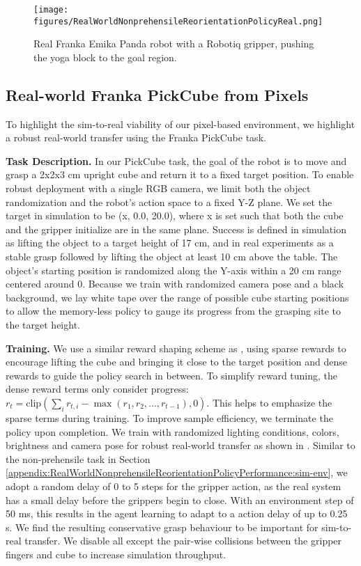 \begin{figure}[t]
    \centering
    \texttt{[image: figures/RealWorldNonprehensileReorientationPolicyReal.png]}
    \caption{\small Real Franka Emika Panda robot with a Robotiq gripper, pushing the yoga block to the goal region.}
    \label{fig:panda-real-setup}
\end{figure}

\clearpage

\subsection{Real-world Franka PickCube from Pixels}
\label{appendix:RealWorldPixels}
To highlight the sim-to-real viability of our pixel-based environment, we highlight a robust real-world transfer using the Franka PickCube task.

\textbf{Task Description.} In our PickCube task, the goal of the robot is to move and grasp a 2x2x3 cm upright cube and return it to a fixed target position. To enable robust deployment with a single RGB camera, we limit both the object randomization and the robot's action space to a fixed Y-Z plane. We set the target in simulation to be (x, 0.0, 20.0), where x is set such that both the cube and the gripper initialize are in the same plane. Success is defined in simulation as lifting the object to a target height of 17 cm, and in real experiments as a stable grasp followed by lifting the object at least 10 cm above the table. The object's starting position is randomized along the Y-axis within a 20 cm range centered around 0. Because we train with randomized camera pose and a black background, we lay white tape over the range of possible cube starting positions to allow the memory-less policy to gauge its progress from the grasping site to the target height.

\textbf{Training.} We use a similar reward shaping scheme as \cite{petrenko2023dexPBT}, using sparse rewards to encourage lifting the cube and bringing it close to the target position and dense rewards to guide the policy search in between. To simplify reward tuning, the dense reward terms only consider progress: $r_t = \mbox{clip}\left(\sum_i r_{t,i} - \max(r_1, r_2, ..., r_{t-1}), 0\right)$. This helps to emphasize the sparse terms during training. To improve sample efficiency, we terminate the policy upon completion. We train with randomized lighting conditions, colors, brightness and camera pose for robust real-world transfer as shown in . Similar to the non-prehensile task in Section \ref{appendix:RealWorldNonprehensileReorientationPolicyPerformance:sim-env}, we adopt a random delay of 0 to 5 steps for the gripper action, as the real system has a small delay before the grippers begin to close. With an environment step of 50 ms, this results in the agent learning to adapt to a action delay of up to 0.25 s. We find the resulting conservative grasp behaviour to be important for sim-to-real transfer. We disable all except the pair-wise collisions between the gripper fingers and cube to increase simulation throughput.

